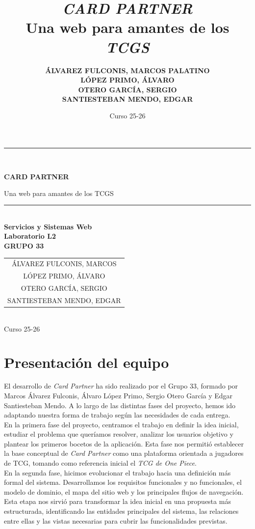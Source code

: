 \documentclass[10pt]{article}
\title{\textit{CARD PARTNER}\\ Una web para amantes de los \textit{TCGS}}
\author{
	\textbf{\small ÁLVAREZ FULCONIS, MARCOS PALATINO}\\
	\textbf{\small LÓPEZ PRIMO, ÁLVARO}\\
	\textbf{\small OTERO GARCÍA, SERGIO}\\
	\textbf{\small SANTIESTEBAN MENDO, EDGAR}
}
\date{Curso 25-26}
\begin{document}
	
	\begin{titlepage}
		\centering
		\rule{\linewidth}{0.2mm}\\[0.4cm]
		{\huge\bfseries CARD PARTNER\par}
		{\large Una web para amantes de los TCGS\par}
		\rule{\linewidth}{0.2mm}\\[1.5cm]
		{\Large\bfseries Servicios y Sistemas Web}\\[0.3cm]
		{\large\bfseries Laboratorio L2 \\ GRUPO 33}\\[1cm]
		{\Large \begin{tabular}{c} ÁLVAREZ FULCONIS, MARCOS \\ LÓPEZ PRIMO, ÁLVARO \\ OTERO GARCÍA, SERGIO \\ SANTIESTEBAN MENDO, EDGAR \end{tabular}}\\[1.5cm]
		{\Large Curso 25-26}
	\end{titlepage}
	
	\tableofcontents \newpage
	
	\setcounter{page}{1}
	
	\section{Presentación del equipo}
        El desarrollo de \textit{Card Partner} ha sido realizado por el Grupo 33, formado por Marcos Álvarez Fulconis, Álvaro López Primo, Sergio Otero García y Edgar Santiesteban Mendo. A lo largo de las distintas fases del proyecto, hemos ido adaptando nuestra forma de trabajo según las necesidades de cada entrega.\\
        
        En la primera fase del proyecto, centramos el trabajo en definir la idea inicial, estudiar el problema que queríamos resolver, analizar los usuarios objetivo y plantear los primeros bocetos de la aplicación. Esta fase nos permitió establecer la base conceptual de \textit{Card Partner} como una plataforma orientada a jugadores de TCG, tomando como referencia inicial el \textit{TCG de One Piece}.\\
        
        En la segunda fase, hicimos evolucionar el trabajo hacia una definición más formal del sistema. Desarrollamos los requisitos funcionales y no funcionales, el modelo de dominio, el mapa del sitio web y los principales flujos de navegación. Esta etapa nos sirvió para transformar la idea inicial en una propuesta más estructurada, identificando las entidades principales del sistema, las relaciones entre ellas y las vistas necesarias para cubrir las funcionalidades previstas.\\
        
\end{document}
